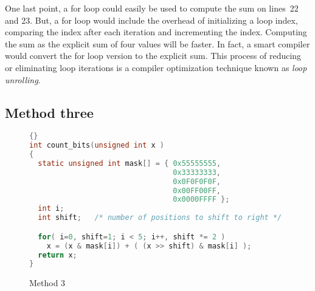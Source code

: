 One last point, a {\code for} loop could easily be used to compute the
sum on lines~22 and 23. But, a {\code for} loop would include the
overhead of initializing a loop index, comparing the index after each
iteration and incrementing the index. Computing the sum as the
explicit sum of four values will be faster. In fact, a smart compiler
would convert the {\code for} loop version to the explicit sum. This
process of reducing or eliminating loop iterations is a compiler
optimization technique known as \emph{loop unrolling}.

\subsection{Method three}

\begin{figure}[t]
\begin{lstlisting}[frame=tlrb, language=C]{}
int count_bits(unsigned int x )
{
  static unsigned int mask[] = { 0x55555555,
                                 0x33333333,
                                 0x0F0F0F0F,
                                 0x00FF00FF,
                                 0x0000FFFF };
  int i;
  int shift;   /* number of positions to shift to right */

  for( i=0, shift=1; i < 5; i++, shift *= 2 )
    x = (x & mask[i]) + ( (x >> shift) & mask[i] );
  return x;
}
\end{lstlisting}
\caption{Method 3 \label{fig:method3}}
\end{figure}

